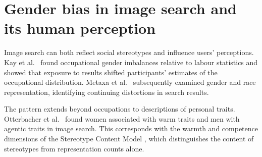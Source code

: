 
\section{Gender bias in image search and its human perception}\label{sec:bg-search}

Image search can both reflect social stereotypes and influence users'
perceptions. Kay et al.\ \cite{kay2015unequal} found occupational gender
imbalances relative to labour statistics and showed that exposure to results
shifted participants' estimates of the occupational distribution.
Metaxa et al.\ \cite{metaxa2021image} subsequently examined gender and
race representation, identifying continuing distortions in search results.

The pattern extends beyond occupations to descriptions of personal traits.
Otterbacher et al.\ \cite{otterbacher2017competent} found women associated
with warm traits and men with agentic traits in image search.
This corresponds with the warmth and competence dimensions of the Stereotype
Content Model \cite{fiske2002scm}, which distinguishes the content of
stereotypes from representation counts alone.

